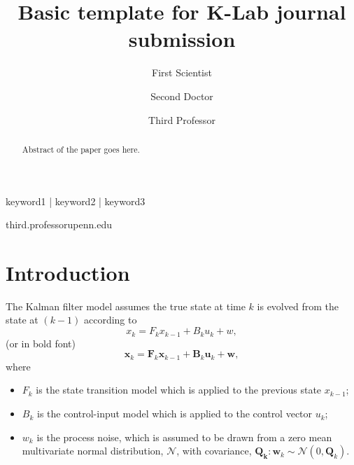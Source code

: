 
\title{Basic template for K-Lab journal submission}

\author[1]{First Scientist }
\author[2]{Second Doctor }
\author[1,\Letter]{Third Professor }
\date{}

\maketitle

\begin{abstract}
Abstract of the paper goes here.
\lipsum[1]
\end{abstract}

\begin{keywords}
keyword1 | keyword2 | keyword3
\end{keywords}

\begin{corrauthor}
third.professor\at upenn.edu
\end{corrauthor}

\section*{Introduction}\label{s:introduction}

The Kalman filter model assumes the true state at time $k$ is evolved from the state at $(k - 1)$ according to
\begin{equation}
    x _{k}=F_{k} x _{k-1}+ B_{k} u _{k}+ w,
\end{equation}
(or in bold font)
\begin{equation}
    \mathbf{x}_{k}=\mathbf{F}_{k} \mathbf{x}_{k-1} + \mathbf{B}_{k} \mathbf{u}_{k}+ \mathbf{w},
\end{equation}
where

\begin{itemize}
    \item $F_k$ is the state transition model which is applied to the previous state $x_{k-1}$;
    \item $B_k$ is the control-input model which is applied to the control vector $u_k$;
    \item $w_k$ is the process noise, which is assumed to be drawn from a zero mean multivariate normal distribution, $\mathbf{\mathcal{N}}$, with covariance, $\mathbf{Q_k}: {\displaystyle \mathbf {w} _{k}\sim {\mathcal {N}}\left(0,\mathbf {Q} _{k}\right)}$.
\end{itemize}

